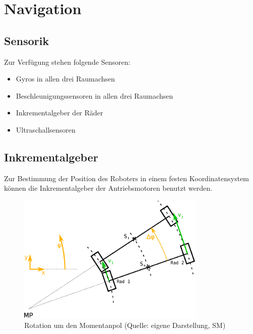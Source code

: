\renewcommand{\autoren}{Stephan Morongowski}
\newpage
\section{Navigation}
\subsection{Sensorik}
Zur Verfügung stehen folgende Sensoren:
\begin{itemize}
\item Gyros in allen drei Raumachsen
\item Beschleunigungssensoren in allen drei Raumachsen
\item Inkrementalgeber der Räder
\item Ultraschallsensoren
\end{itemize}

\subsection{Inkrementalgeber}

Zur Bestimmung der Position des Roboters in einem festen Koordinatensystem können die Inkrementalgeber der Antriebsmotoren benutzt werden.

\begin{figure}[h]  %
\centering\includegraphics[width=0.8\textwidth]{images/Kurvenkinematic.eps}
\caption{Rotation um den Momentanpol \newline (Quelle: eigene Darstellung, SM)}
\label{kurvenkinematik}
\end{figure}

